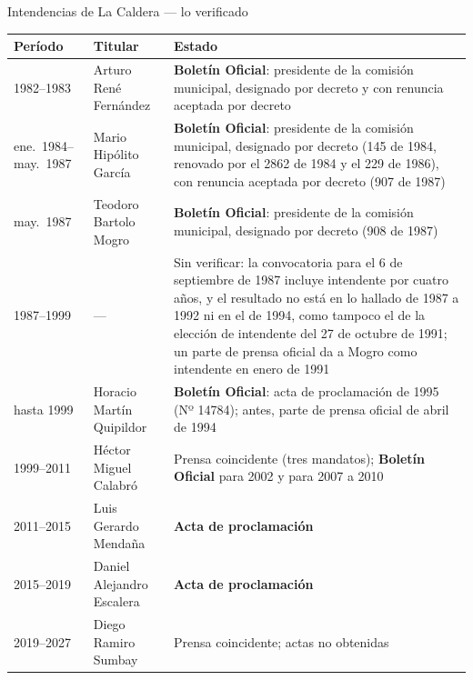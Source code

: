 \begin{ficha}{Intendencias de La Caldera --- lo verificado}
\begin{center}\small
\begin{tabular}{@{}llp{4.2cm}@{}}
\toprule
\textbf{Período} & \textbf{Titular} & \textbf{Estado} \\
\midrule
1982--1983 & Arturo René Fernández & \textbf{Boletín Oficial}: presidente de la comisión municipal, designado por decreto y con renuncia aceptada por decreto \\
ene.\ 1984--may.\ 1987 & Mario Hipólito García & \textbf{Boletín Oficial}: presidente de la comisión municipal, designado por decreto (145 de 1984, renovado por el 2862 de 1984 y el 229 de 1986), con renuncia aceptada por decreto (907 de 1987) \\
may.\ 1987 & Teodoro Bartolo Mogro & \textbf{Boletín Oficial}: presidente de la comisión municipal, designado por decreto (908 de 1987) \\
1987--1999 & --- & Sin verificar: la convocatoria para el 6 de septiembre de 1987 incluye intendente por cuatro años, y el resultado no está en lo hallado de 1987 a 1992 ni en el de 1994, como tampoco el de la elección de intendente del 27 de octubre de 1991; un parte de prensa oficial da a Mogro como intendente en enero de 1991 \\
hasta 1999 & Horacio Martín Quipildor & \textbf{Boletín Oficial}: acta de proclamación de 1995 (Nº 14784); antes, parte de prensa oficial de abril de 1994 \\
1999--2011 & Héctor Miguel Calabró\index{Calabró, Héctor Miguel} & Prensa coincidente (tres mandatos); \textbf{Boletín Oficial} para 2002 y para 2007 a 2010 \\
2011--2015 & Luis Gerardo Mendaña\index{Mendaña, Luis Gerardo} & \textbf{Acta de proclamación} \\
2015--2019 & Daniel Alejandro Escalera\index{Escalera, Daniel Alejandro} & \textbf{Acta de proclamación} \\
2019--2027 & Diego Ramiro Sumbay\index{Sumbay, Diego Ramiro} & Prensa coincidente; actas no obtenidas \\
\bottomrule
\end{tabular}
\end{center}
\end{ficha}

